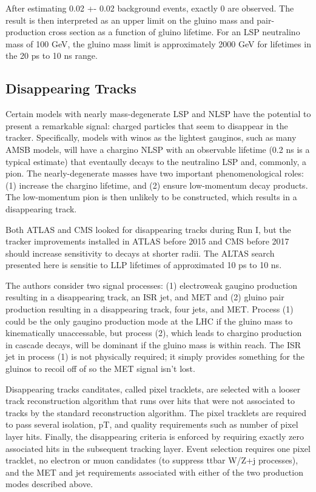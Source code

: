 \documentclass[12pt]{article}
\begin{document}
            After estimating 0.02 +- 0.02 background events, exactly 0 are observed. The result is then interpreted as an upper limit on the gluino mass and pair-production cross section as a function of gluino lifetime. For an LSP neutralino mass of 100 GeV, the gluino mass limit is approximately 2000 GeV for lifetimes in the 20 ps to 10 ns range.

\subsection{Disappearing Tracks}
            Certain models with nearly mass-degenerate LSP and NLSP have the potential to present a remarkable signal: charged particles that seem to disappear in the tracker. Specifically, models with winos as the lightest gauginos, such as many AMSB models, will have a chargino NLSP with an observable lifetime (0.2 ns is a typical estimate) that eventaully decays to the neutralino LSP and, commonly, a pion. The nearly-degenerate masses have two important phenomenological roles: (1) increase the chargino lifetime, and (2) ensure low-momentum decay products. The low-momentum pion is then unlikely to be constructed, which results in a disappearing track.

            Both ATLAS and CMS looked for disappearing tracks during Run I, but the tracker improvements installed in ATLAS before 2015 and CMS before 2017 should increase sensitivity to decays at shorter radii. The ALTAS search presented here is sensitie to LLP lifetimes of approximated 10 ps to 10 ns.

            The authors consider two signal processes: (1) electroweak gaugino production resulting in a disappearing track, an ISR jet, and MET and (2) gluino pair production resulting in a disappearing track, four jets, and MET. Process (1) could be the only gaugino production mode at the LHC if the gluino mass to kinematically unaccessable, but process (2), which leads to chargino production in cascade decays, will be dominant if the gluino mass is within reach. The ISR jet in process (1) is not physically required; it simply provides something for the gluinos to recoil off of so the MET signal isn't lost.

            Disappearing tracks canditates, called pixel tracklets, are selected with a looser track reconstruction algorithm that runs over hits that were not associated to tracks by the standard reconstruction algorithm. The pixel tracklets are required to pass several isolation, pT, and quality requirements such as number of pixel layer hits. Finally, the disappearing criteria is enforced by requiring exactly zero associated hits in the subsequent tracking layer. Event selection requires one pixel tracklet, no electron or muon candidates (to suppress ttbar W/Z+j processes), and the MET and jet requirements associated with either of the two production modes described above.
            
\end{document}
